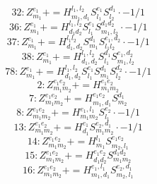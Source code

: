 \documentclass[letterpaper,10pt,fleqn,leqno,onecolumn]{article}
\begin{document}
\begin{equation} \;\;\;\;\;\;  32: Z^{e_{1}}_{m_{1}}+=H^{l_{1},l_{2}}_{m_{1},d_{1}}S^{e_{1}}_{l_{1}}S^{d_{1}}_{l_{2}}\cdot -1/1 \end{equation}
\begin{equation} \;\;\;\;\;\;  36: Z^{e_{1}}_{m_{1}}+=H^{l_{1},l_{2}}_{d_{1}d_{2}}S^{e_{1}}_{l_{1}}S^{d_{1}d_{2}}_{m_{1},l_{2}}\cdot -1/1 \end{equation}
\begin{equation} \;\;\;\;\;\;  37: Z^{e_{1}}_{m_{1}}+=H^{l_{1}l_{2}}_{d_{1},d_{2}}S^{d_{1}}_{m_{1}}S^{e_{1},d_{2}}_{l_{1}l_{2}}\cdot -1/1 \end{equation}
\begin{equation} \;\;\;\;\;\;  38: Z^{e_{1}}_{m_{1}}+=H^{l_{1},l_{2}}_{d_{1},d_{2}}S^{d_{1}}_{l_{1}}S^{e_{1},d_{2}}_{m_{1},l_{2}} \end{equation}
\begin{equation} \;\;\;\;\;\;  78: Z^{e_{1}}_{m_{1}}+=H^{l_{1},l_{2}}_{d_{1},d_{2}}S^{e_{1}}_{l_{1}}S^{d_{1}}_{m_{1}}S^{d_{2}}_{l_{2}}\cdot -1/1 \end{equation}
\begin{equation} \;\;\;\;\;\;  2: Z^{e_{1}e_{2}}_{m_{1}m_{2}}+=H^{e_{1}e_{2}}_{m_{1}m_{2}} \end{equation}
\begin{equation} \;\;\;\;\;\;  7: Z^{e_{1}e_{2}}_{m_{1}m_{2}}+=H^{e_{1}e_{2}}_{m_{1},d_{1}}S^{d_{1}}_{m_{2}} \end{equation}
\begin{equation} \;\;\;\;\;\;  8: Z^{e_{1}e_{2}}_{m_{1}m_{2}}+=H^{e_{1},l_{1}}_{m_{1}m_{2}}S^{e_{2}}_{l_{1}}\cdot -1/1 \end{equation}
\begin{equation} \;\;\;\;\;\;  13: Z^{e_{1}e_{2}}_{m_{1}m_{2}}+=H^{e_{1}}_{d_{1}}S^{e_{2},d_{1}}_{m_{1}m_{2}}\cdot -1/1 \end{equation}
\begin{equation} \;\;\;\;\;\;  14: Z^{e_{1}e_{2}}_{m_{1}m_{2}}+=H^{l_{1}}_{m_{1}}S^{e_{1}e_{2}}_{m_{2},l_{1}} \end{equation}
\begin{equation} \;\;\;\;\;\;  15: Z^{e_{1}e_{2}}_{m_{1}m_{2}}+=H^{e_{1}e_{2}}_{d_{1}d_{2}}S^{d_{1}d_{2}}_{m_{1}m_{2}} \end{equation}
\begin{equation} \;\;\;\;\;\;  16: Z^{e_{1}e_{2}}_{m_{1}m_{2}}+=H^{e_{1},l_{1}}_{m_{1},d_{1}}S^{e_{2},d_{1}}_{m_{2},l_{1}} \end{equation}
\end{document}
